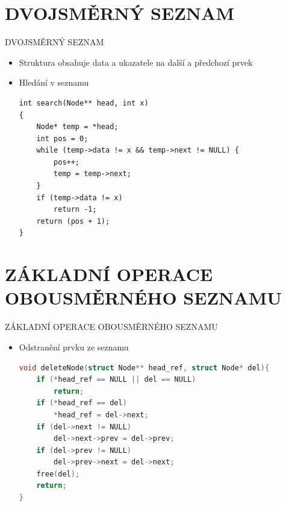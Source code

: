 \documentclass[9pt]{beamer}
\begin{document}
\section{DVOJSMĚRNÝ SEZNAM}
\begin{frame}[fragile]{DVOJSMĚRNÝ SEZNAM}
\begin{figure}[h]
\end{figure}
\begin{itemize}
    \item Struktura obsahuje data a ukazatele na další a předchozí prvek
    \item Hledání v seznamu
    \begin{lstlisting}
int search(Node** head, int x)
{
    Node* temp = *head;
    int pos = 0;
    while (temp->data != x && temp->next != NULL) {
        pos++;
        temp = temp->next;
    }
    if (temp->data != x)
        return -1;
    return (pos + 1);
}
    \end{lstlisting}
\end{itemize}
\end{frame}


\section{ZÁKLADNÍ OPERACE OBOUSMĚRNÉHO SEZNAMU}
\begin{frame}[fragile]{ZÁKLADNÍ OPERACE OBOUSMĚRNÉHO SEZNAMU}
\begin{itemize}
\item Odstranění prvku ze seznamu
    \begin{lstlisting}[language=C]
void deleteNode(struct Node** head_ref, struct Node* del){
    if (*head_ref == NULL || del == NULL)
        return;
    if (*head_ref == del)
        *head_ref = del->next;
    if (del->next != NULL)
        del->next->prev = del->prev;
    if (del->prev != NULL)
        del->prev->next = del->next;
    free(del);
    return;
}
    \end{lstlisting}
\end{itemize}
\end{frame}
\end{document}
